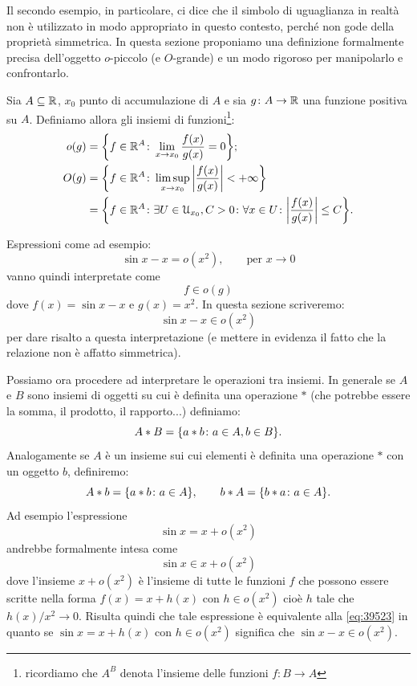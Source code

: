 Il secondo esempio, in particolare, ci dice che il simbolo di uguaglianza in realtà non è utilizzato in modo appropriato in questo contesto, perché non gode della proprietà simmetrica. In questa sezione proponiamo una definizione formalmente precisa dell'oggetto $o$-piccolo (e $O$-grande) e un modo rigoroso per manipolarlo e confrontarlo.

\begin{definition}
Sia $A\subseteq \mathbb R$, $x_0$ punto di accumulazione di $A$
e sia $g\colon A \to \mathbb R$ una funzione positiva su $A$.
Definiamo allora gli insiemi di funzioni\footnote{%
ricordiamo che $A^B$ denota l'insieme delle funzioni $f\colon B \to A$}:
\begin{align*}
  o(g) &= {\left\{ f\in \mathbb R^A \colon \lim_{x\to x_0}\frac{f(x)}{g(x)} = 0 \right\}};\\
  O(g) &= {\left\{ f\in \mathbb R^A \colon \limsup_{x\to x_0}{\left|\frac{f(x)}{g(x)}\right|} < + \infty \right\}}\\
       &= {\left\{ f\in \mathbb R^A \colon \exists U\in \mathcal U_{x_0}, C>0 \colon \forall x \in U\colon {\left|\frac{f(x)}{g(x)}\right|}\le C \right\}}.
\end{align*}
\end{definition}

Espressioni come ad esempio:
\[
  \sin x - x = o(x^2), \qquad \text{per $x\to 0$}
\]
vanno quindi interpretate come
\[
  f \in o(g)
\]
dove $f(x) = \sin x -x $ e $g(x) = x^2$.
In questa sezione scriveremo:
\begin{equation}\label{eq:39523}
  \sin x - x \in o(x^2)
\end{equation}
per dare risalto a questa interpretazione (e mettere in evidenza il fatto che la relazione non è affatto simmetrica).

Possiamo ora procedere ad interpretare le operazioni tra insiemi. In generale se $A$ e $B$ sono insiemi di oggetti su cui è definita una operazione $*$ (che potrebbe essere la somma, il prodotto, il rapporto...) definiamo:
\[
  A * B = {\left\{ a*b \colon a \in A, b\in B \right\}}.
\]
Analogamente se $A$ è un insieme sui cui elementi è definita una operazione $*$ con un oggetto $b$, definiremo:
\[
  A * b = {\left\{ a*b\colon a \in A \right\}}, \qquad
  b * A = {\left\{ b*a\colon a \in A \right\}}.
\]
Ad esempio l'espressione
\[
  \sin x = x + o(x^2)
\]
andrebbe formalmente intesa come
\[
  \sin x  \in x + o(x^2)
\]
dove l'insieme $x+ o(x^2)$ è l'insieme di tutte le funzioni
$f$ che possono essere scritte nella forma $f(x) = x+h(x)$ con $h\in o(x^2)$ cioè $h$ tale che $h(x)/x^2 \to 0$. Risulta quindi che tale espressione è equivalente alla \eqref{eq:39523} in quanto se $\sin x = x + h(x)$ con $h\in o(x^2)$ significa che $\sin x- x \in o(x^2)$.

